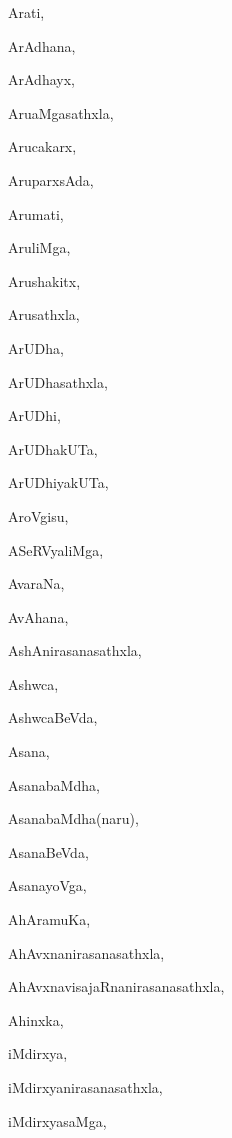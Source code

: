 \begin{multicols}{2}
{Arati}, \pageref{Arati}

{ArAdhana}, \pageref{ArAdhana}

{ArAdhayx}, \pageref{ArAdhayx}

{{Aru}aMgasathxla}, \pageref{Aru(273304)aMgasathxla}

{Arucakarx}, \pageref{Arucakarx}

{AruparxsAda}, \pageref{AruparxsAda}

{Arumati}, \pageref{Arumati}

{AruliMga}, \pageref{AruliMga}

{Arushakitx}, \pageref{Aru(273304)shakitx}

{Arusathxla}, \pageref{Arusathxla}

{ArUDha}, \pageref{ArUDha}

{ArUDhasathxla}, \pageref{ArUDhasathxla}

{ArUDhi}, \pageref{ArUDhi}

{ArUDhakUTa}, \pageref{ArUDhakUTa}

{ArUDhiyakUTa}, \pageref{ArUDhiyakUTa}

{AroVgisu}, \pageref{AroVgisu}

{ASeRVyaliMga}, \pageref{ASeRVyaliMga}

{AvaraNa}, \pageref{AvaraNa}

{AvAhana}, \pageref{AvAhana}

{AshAnirasanasathxla}, \pageref{AshAnirasanasathxla}

{Ashwca}, \pageref{Ashwca}

{AshwcaBeVda}, \pageref{AshwcaBeVda}

{Asana}, \pageref{Asana}

{AsanabaMdha}, \pageref{AsanabaMdha}

{AsanabaMdha(naru)}, \pageref{AsanabaMdha(naru)}

{AsanaBeVda}, \pageref{AsanaBeVda}

{AsanayoVga}, \pageref{AsanayoVga}

{AhAramuKa}, \pageref{AhAramuKa}

{AhAvxnanirasanasathxla}, \pageref{AhAvxnanirasanasathxla}

{AhAvxnavisajaRnanirasanasathxla}, \pageref{AhAvxnavisajaRnanirasanasathxla}

{Ahinxka}, \pageref{Ahinxka}

{iMdirxya}, \pageref{iMdirxya}

{iMdirxyanirasanasathxla}, \pageref{iMdirxyanirasanasathxla}

{iMdirxyasaMga}, \pageref{iMdirxyasaMga}


\end{multicols}
